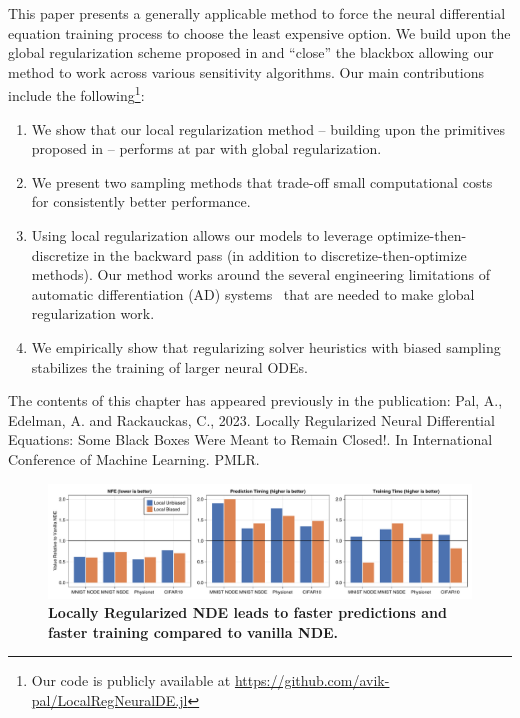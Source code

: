 This paper presents a generally applicable method to force the neural differential equation training process to choose the least expensive option. We build upon the global regularization scheme proposed in \citet{pal2021opening} and ``close'' the blackbox allowing our method to work across various sensitivity algorithms. Our main contributions include the following\footnote{Our code is publicly available at \url{https://github.com/avik-pal/LocalRegNeuralDE.jl}}:
%
\begin{enumerate}
  \item We show that our local regularization method -- building upon the primitives proposed in \citet{pal2021opening} -- performs at par with global regularization.

  \item We present two sampling methods that trade-off small computational costs for consistently better performance.

  \item Using local regularization allows our models to leverage optimize-then-discretize in the backward pass (in addition to discretize-then-optimize methods). Our method works around the several engineering limitations of automatic differentiation (AD) systems~\citep{rackauckas_2022} that are needed to make global regularization work.

  \item We empirically show that regularizing solver heuristics with biased sampling stabilizes the training of larger neural ODEs.
\end{enumerate}
%

The contents of this chapter has appeared previously in the publication: Pal, A., Edelman, A. and Rackauckas, C., 2023. Locally Regularized Neural Differential Equations: Some Black Boxes Were Meant to Remain Closed!. In International Conference of Machine Learning. PMLR. \citep{pal2023locally}

\begin{figure}[t]
  \centering
  \includegraphics[width=\textwidth]{../figures/local_regularizing_neural_des/summary_plot.pdf}
  \caption{\textbf{Locally Regularized NDE leads to faster predictions and faster training compared to vanilla NDE.}}
  \label{fig:localreg_summary_plot}
\end{figure}


